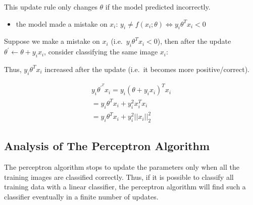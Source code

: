 \documentclass[12pt,a4paper]{article}
\begin{document}
This update rule only changes \(\theta\) if the model predicted
incorrectly.

\begin{itemize}
\item
  the model made a mistake on \(x_i\):
  \(y_i \neq f(x_i;\theta) \iff y_i\theta^Tx_i <0\)
\end{itemize}

Suppose we make a mistake on \(x_i\) (i.e.~\(y_i\theta^Tx_i <0\)), then
after the update \(\theta^\prime \leftarrow \theta + y_ix_i\), consider
classifying the same image \(x_i\):

Thus, \(y_i\theta^Tx_i\) increased after the update (i.e.~it becomes
more positive/correct).

\begin{align}y_i\theta^{\prime^T}x_i=y_i(\theta+y_ix_i)^Tx_i \\=y_i\theta^Tx_i+y_i^2x_i^Tx_i\\=y_i\theta^Tx_i+y_i^2||x_i||_2^2\end{align}

\subsection{Analysis of The Perceptron
Algorithm}

The perceptron algorithm stops to update the parameters only when all
the training images are classified correctly. Thus, if it is possible to
classify all training data with a linear classifier, the perceptron
algorithm will find such a classifier eventually in a finite number of
updates.
\end{document}
